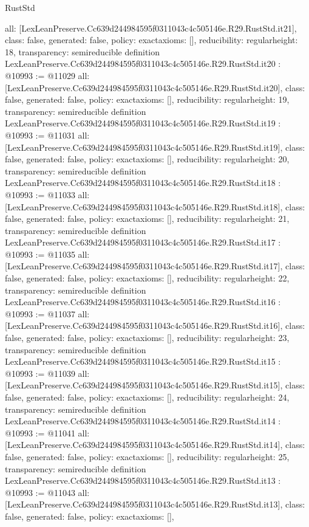 \begin{lexlean}{RustStd}
\begin{coremodule}
{  all: [LexLeanPreserve.Cc639d244984595f0311043c4c505146e.R29.RustStd.it21],
  class: false,
  generated: false,
  policy: exact{axioms: []},
  reducibility: regular{height: 18},
  transparency: semireducible
}
definition LexLeanPreserve.Cc639d244984595f0311043c4c505146e.R29.RustStd.it20 : @10993 := @11029 {
  all: [LexLeanPreserve.Cc639d244984595f0311043c4c505146e.R29.RustStd.it20],
  class: false,
  generated: false,
  policy: exact{axioms: []},
  reducibility: regular{height: 19},
  transparency: semireducible
}
definition LexLeanPreserve.Cc639d244984595f0311043c4c505146e.R29.RustStd.it19 : @10993 := @11031 {
  all: [LexLeanPreserve.Cc639d244984595f0311043c4c505146e.R29.RustStd.it19],
  class: false,
  generated: false,
  policy: exact{axioms: []},
  reducibility: regular{height: 20},
  transparency: semireducible
}
definition LexLeanPreserve.Cc639d244984595f0311043c4c505146e.R29.RustStd.it18 : @10993 := @11033 {
  all: [LexLeanPreserve.Cc639d244984595f0311043c4c505146e.R29.RustStd.it18],
  class: false,
  generated: false,
  policy: exact{axioms: []},
  reducibility: regular{height: 21},
  transparency: semireducible
}
definition LexLeanPreserve.Cc639d244984595f0311043c4c505146e.R29.RustStd.it17 : @10993 := @11035 {
  all: [LexLeanPreserve.Cc639d244984595f0311043c4c505146e.R29.RustStd.it17],
  class: false,
  generated: false,
  policy: exact{axioms: []},
  reducibility: regular{height: 22},
  transparency: semireducible
}
definition LexLeanPreserve.Cc639d244984595f0311043c4c505146e.R29.RustStd.it16 : @10993 := @11037 {
  all: [LexLeanPreserve.Cc639d244984595f0311043c4c505146e.R29.RustStd.it16],
  class: false,
  generated: false,
  policy: exact{axioms: []},
  reducibility: regular{height: 23},
  transparency: semireducible
}
definition LexLeanPreserve.Cc639d244984595f0311043c4c505146e.R29.RustStd.it15 : @10993 := @11039 {
  all: [LexLeanPreserve.Cc639d244984595f0311043c4c505146e.R29.RustStd.it15],
  class: false,
  generated: false,
  policy: exact{axioms: []},
  reducibility: regular{height: 24},
  transparency: semireducible
}
definition LexLeanPreserve.Cc639d244984595f0311043c4c505146e.R29.RustStd.it14 : @10993 := @11041 {
  all: [LexLeanPreserve.Cc639d244984595f0311043c4c505146e.R29.RustStd.it14],
  class: false,
  generated: false,
  policy: exact{axioms: []},
  reducibility: regular{height: 25},
  transparency: semireducible
}
definition LexLeanPreserve.Cc639d244984595f0311043c4c505146e.R29.RustStd.it13 : @10993 := @11043 {
  all: [LexLeanPreserve.Cc639d244984595f0311043c4c505146e.R29.RustStd.it13],
  class: false,
  generated: false,
  policy: exact{axioms: []},
}
\end{coremodule}
\end{lexlean}
